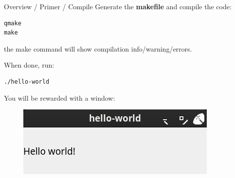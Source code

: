 \documentclass[11pt]{beamer}
\renewcommand{\emph}[1]{\textbf{#1}}
\begin{document}
\begin{frame}[fragile]{Overview / Primer / Compile}
 Generate the \emph{makefile} and compile the code:
 \begin{lstlisting}
qmake
make
\end{lstlisting}
 the make command will show compilation info/warning/errors.
 
 When done, run:
 \begin{lstlisting}
./hello-world
\end{lstlisting}
 
 You will be rewarded with a window:
 \begin{figure}
  \includegraphics[height=.2\textheight]{assets/figure-hello-world}
 \end{figure}
\end{frame}
\end{document}
